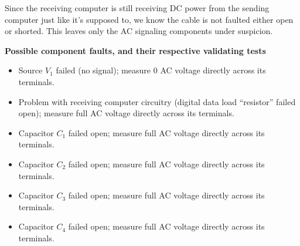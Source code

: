 Since the receiving computer is still receiving DC power from the sending computer just like it's supposed to, we know the cable is not faulted either open or shorted.  This leaves only the AC signaling components under suspicion.

\vskip 10pt

\noindent
{\bf Possible component faults, and their respective validating tests}

\begin{itemize}
\item{} Source $V_1$ failed (no signal); measure 0 AC voltage directly across its terminals.
\item{} Problem with receiving computer circuitry (digital data load ``resistor'' failed open); measure full AC voltage directly across its terminals.
\item{} Capacitor $C_1$ failed open; measure full AC voltage directly across its terminals.
\item{} Capacitor $C_2$ failed open; measure full AC voltage directly across its terminals.
\item{} Capacitor $C_3$ failed open; measure full AC voltage directly across its terminals.
\item{} Capacitor $C_4$ failed open; measure full AC voltage directly across its terminals.
\end{itemize}




